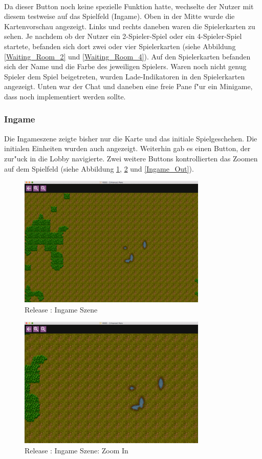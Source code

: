 \documentclass[12pt, titlepage]{scrartcl}
\newcommand{\RN}[1]{%
	\textup{\uppercase\expandafter{\romannumeral#1}}%
}
\begin{document}
			    \ \\  Da dieser Button noch keine spezielle Funktion hatte, wechselte der Nutzer mit diesem testweise auf das Spielfeld (Ingame). Oben in der Mitte wurde die Kartenvorschau angezeigt.  Links und rechts daneben waren die Spielerkarten zu sehen. Je nachdem ob der Nutzer ein 2-Spieler-Spiel oder ein 4-Spieler-Spiel startete, befanden sich dort zwei oder vier Spielerkarten (siehe Abbildung \ref{Waiting_Room_2} und \ref{Waiting_Room_4}). Auf den Spielerkarten befanden sich der Name und die Farbe des jeweiligen Spielers. Waren noch nicht genug Spieler dem Spiel beigetreten, wurden Lade-Indikatoren in den Spielerkarten angezeigt. Unten war der Chat und daneben eine freie Pane f"ur ein Minigame, dass noch implementiert werden sollte.
	        \subsubsection{Ingame}
	            Die Ingameszene zeigte bisher nur die Karte und das initiale Spielgeschehen. Die initialen Einheiten wurden auch angezeigt. Weiterhin gab es einen Button, der zur"uck in die Lobby navigierte. Zwei weitere Buttons kontrollierten das Zoomen auf dem Spielfeld (siehe Abbildung \ref{Ingame}, \ref{Ingame_In} und \ref{Ingame_Out}). \\
	            \begin{figure}[H] 
    				\centering
    				\includegraphics[width=0.8\textwidth]{images/old_state/ingame/Ingame.png}
    				\caption{Release \RN{2}: Ingame Szene}
    				\label{Ingame}
			    \end{figure}
			    \begin{figure}[H] 
    				\centering
    				\includegraphics[width=0.8\textwidth]{images/old_state/ingame/ZoomIn.png}
    				\caption{Release \RN{2}: Ingame Szene: Zoom In}
    				\label{Ingame_In}
			    \end{figure}
\end{document}
